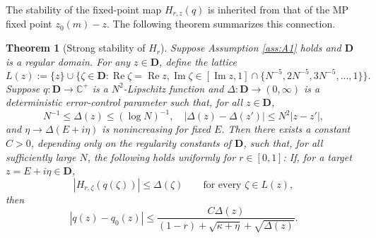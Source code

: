 \documentclass[11pt,reqno]{amsart}
\def\C{\mathbb{C}}
\def\bD{\mathbf{D}}
\def\Im{\operatorname{Im}}
\def\Re{\operatorname{Re}}
\newtheorem{theorem}{Theorem}[section]
\theoremstyle{definition}
\numberwithin{equation}{section}
\numberwithin{figure}{section}
\begin{document}
The stability of the fixed-point map $H_{r,z}(q)$ is inherited from that of the MP fixed point $z_0(m)-z$. The following theorem summarizes this connection.
\begin{theorem}[Strong stability of $H_r$]\label{thm:strong-stability}
Suppose Assumption \ref{ass:A1} holds and $\bD$ is a regular domain. For any $z\in\bD$, define the lattice
\[
    L(z):=\{z\}\cup\{\zeta\in\bD:\Re\zeta=\Re z,\Im\zeta\in[\Im z,1]\cap\{N^{-5},2N^{-5},3N^{-5},...,1\}\}.
\]
Suppose $q:\bD\rightarrow\C^+$ is a $N^2$-Lipschitz function and $\Delta:\bD\rightarrow(0,\infty)$ is a deterministic error-control parameter such that, for all $z\in\bD$,
\[
    N^{-1}\leq\Delta(z)\leq (\log N)^{-1},\quad  |\Delta(z)-\Delta(z')|\leq N^2|z-z'|,
\]
and $\eta\rightarrow\Delta(E+i\eta)$ is nonincreasing for fixed $E$. Then there exists a constant $C>0$, depending only on the regularity constants of
$\bD$, such that, for all sufficiently large $N$, the following holds
uniformly for $r\in[0,1]$:
If, for a target $z=E+i\eta\in\bD$,
\begin{equation}\label{eq:residual-on-lattice}
 |H_{r,\zeta}(q(\zeta))|\le\Delta(\zeta)
 \qquad\text{for every }\zeta\in L(z),
\end{equation}
then
\begin{equation}\label{eq:main-bound}
 |q(z)-q_0(z)|
 \le
 \frac{C\Delta(z)}
 {(1-r)+\sqrt{\kappa+\eta}+\sqrt{\Delta(z)}}.
\end{equation}
\end{theorem}
\end{document}
